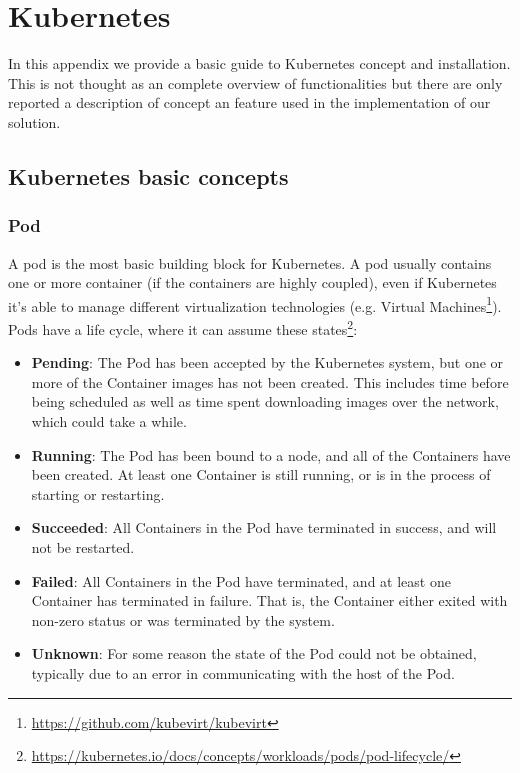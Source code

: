 \chapter{Kubernetes}\label{kubernetes}

In this appendix we provide a basic guide to Kubernetes concept and
installation. This is not thought as an complete overview of functionalities but
there are only reported a description of concept an feature used in the
implementation of our solution. 

\section{Kubernetes basic concepts}\label{kubernetes-basic-concepts}

\subsection{Pod}\label{pod}

A pod is the most basic building block for Kubernetes. A pod usually
contains one or more container (if the containers are highly coupled),
even if Kubernetes it's able to manage different virtualization technologies
(e.g.
Virtual Machines\footnote{\url{https://github.com/kubevirt/kubevirt}}).
Pods have a life cycle, where it can assume these
states\footnote{
\url{https://kubernetes.io/docs/concepts/workloads/pods/pod-lifecycle/}}:
\begin{itemize}
\item
  \textbf{Pending}: The Pod has been accepted by the Kubernetes system,
  but one or more of the Container images has not been created. This
  includes time before being scheduled as well as time spent downloading
  images over the network, which could take a while.
\item
  \textbf{Running}: The Pod has been bound to a node, and all of the
  Containers have been created. At least one Container is still running,
  or is in the process of starting or restarting.
\item
  \textbf{Succeeded}: All Containers in the Pod have terminated in
  success, and will not be restarted.
\item
  \textbf{Failed}: All Containers in the Pod have terminated, and at
  least one Container has terminated in failure. That is, the Container
  either exited with non-zero status or was terminated by the system.
\item
  \textbf{Unknown}: For some reason the state of the Pod could not be
  obtained, typically due to an error in communicating with the host of
  the Pod.
\end{itemize}

